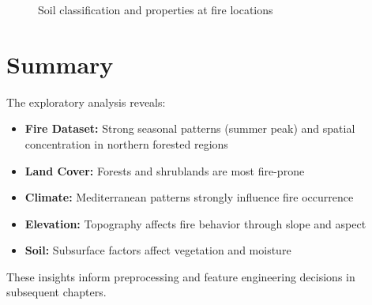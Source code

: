 \begin{figure}[H]
    \centering
    \caption{Soil classification and properties at fire locations}
    \label{fig:soil}
\end{figure}

\section{Summary}
The exploratory analysis reveals:
\begin{itemize}
    \item \textbf{Fire Dataset:} Strong seasonal patterns (summer peak) and spatial concentration in northern forested regions
    \item \textbf{Land Cover:} Forests and shrublands are most fire-prone
    \item \textbf{Climate:} Mediterranean patterns strongly influence fire occurrence
    \item \textbf{Elevation:} Topography affects fire behavior through slope and aspect
    \item \textbf{Soil:} Subsurface factors affect vegetation and moisture
\end{itemize}

These insights inform preprocessing and feature engineering decisions in subsequent chapters.
